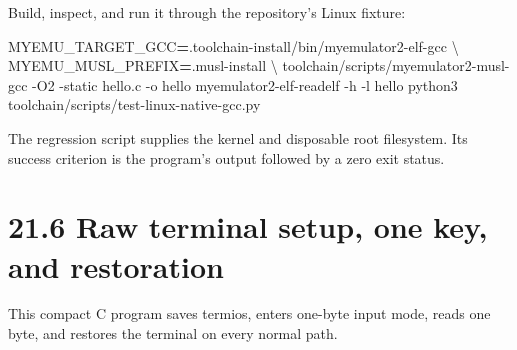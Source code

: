 \documentclass[
  oneside,
  openany]{book}
\newenvironment{Shaded}{\begin{snugshade}}{\end{snugshade}}
\newcommand{\AttributeTok}[1]{\textcolor[rgb]{0.13,0.29,0.53}{#1}}
\newcommand{\DataTypeTok}[1]{\textcolor[rgb]{0.13,0.29,0.53}{#1}}
\newcommand{\ExtensionTok}[1]{#1}
\newcommand{\NormalTok}[1]{#1}
\newcommand{\OperatorTok}[1]{\textcolor[rgb]{0.81,0.36,0.00}{\textbf{#1}}}
\newcommand{\VariableTok}[1]{\textcolor[rgb]{0.00,0.00,0.00}{#1}}
\begin{document}
Build, inspect, and run it through the repository's Linux fixture:

\begin{Shaded}
\begin{Highlighting}[]
\VariableTok{MYEMU\_TARGET\_GCC}\OperatorTok{=}\NormalTok{.toolchain{-}install/bin/myemulator2{-}elf{-}gcc }\DataTypeTok{\textbackslash{}}
\VariableTok{MYEMU\_MUSL\_PREFIX}\OperatorTok{=}\NormalTok{.musl{-}install }\DataTypeTok{\textbackslash{}}
\ExtensionTok{toolchain/scripts/myemulator2{-}musl{-}gcc} \AttributeTok{{-}O2} \AttributeTok{{-}static}\NormalTok{ hello.c }\AttributeTok{{-}o}\NormalTok{ hello}
\ExtensionTok{myemulator2{-}elf{-}readelf} \AttributeTok{{-}h} \AttributeTok{{-}l}\NormalTok{ hello}
\ExtensionTok{python3}\NormalTok{ toolchain/scripts/test{-}linux{-}native{-}gcc.py}
\end{Highlighting}
\end{Shaded}

The regression script supplies the kernel and disposable root
filesystem. Its success criterion is the program's output followed by a
zero exit status.

\hypertarget{raw-terminal-setup-one-key-and-restoration}{%
\section{21.6 Raw terminal setup, one key, and
restoration}\label{raw-terminal-setup-one-key-and-restoration}}

This compact C program saves termios, enters one-byte input mode, reads
one byte, and restores the terminal on every normal path.
\end{document}
